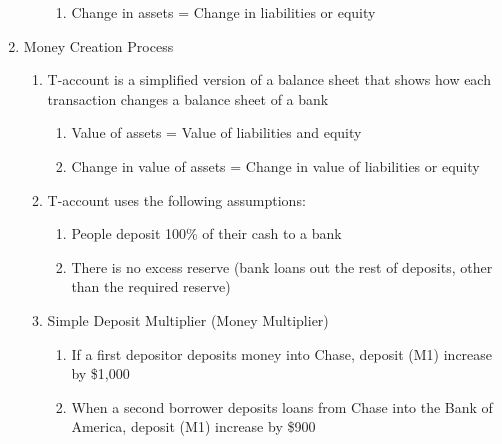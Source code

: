 \documentclass[12pt]{article}
\begin{document}
\begin{enumerate}
\begin{enumerate}
\begin{enumerate}
              \item Change in assets = Change in liabilities or equity

            \end{enumerate}

        \end{enumerate}

      \item Money Creation Process

        \begin{enumerate}

          \item T-account is a simplified version of a balance sheet that shows how each transaction changes a balance sheet of a bank

            \begin{enumerate}

              \item Value of assets = Value of liabilities and equity

              \item Change in value of assets = Change in value of liabilities or equity

            \end{enumerate}

          \item T-account uses the following assumptions:

            \begin{enumerate}

              \item People deposit 100\% of their cash to a bank

              \item There is no excess reserve (bank loans out the rest of deposits, other than the required reserve)

            \end{enumerate}

          \item Simple Deposit Multiplier (Money Multiplier)

            \begin{enumerate}

              \item If a first depositor deposits money into Chase, deposit (M1) increase by \$1,000

              \item When a second borrower deposits loans from Chase into the Bank of America, deposit (M1) increase by \$900


\end{enumerate}
\end{enumerate}
\end{enumerate}
\end{document}

